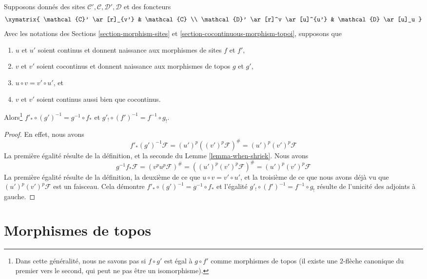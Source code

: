 \begin{lemma}
\label{lemma-special-square-continuous}
Supposons donnés des sites $\mathcal{C}', \mathcal{C}, \mathcal{D}', \mathcal{D}$
et des foncteurs
$$
\xymatrix{
\mathcal{C}' \ar[r]_{v'} &
\mathcal{C} \\
\mathcal{D}' \ar[r]^v \ar[u]^{u'} &
\mathcal{D} \ar[u]_u
}
$$
Avec les notations des Sections \ref{section-morphism-sites}
et \ref{section-cocontinuous-morphism-topoi}, supposons que
\begin{enumerate}
\item $u$ et $u'$ soient continus et donnent naissance aux morphismes de
sites $f$ et $f'$,
\item $v$ et $v'$ soient cocontinus et donnent naissance aux morphismes
de topos $g$ et $g'$,
\item $u \circ v = v' \circ u'$, et
\item $v$ et $v'$ soient continus aussi bien que cocontinus.
\end{enumerate}
Alors\footnote{Dans cette généralité,
nous ne savons pas si $f \circ g'$ est égal à $g \circ f'$
comme morphismes de topos (il existe une $2$-flèche canonique du
premier vers le second, qui peut ne pas être un isomorphisme).}
$f'_* \circ (g')^{-1} = g^{-1} \circ f_*$ et
$g'_! \circ (f')^{-1} = f^{-1} \circ g_!$.
\end{lemma}

\begin{proof}
En effet, nous avons
$$
f'_*(g')^{-1}\mathcal{F} = (u')^p((v')^p\mathcal{F})^\# =
(u')^p(v')^p\mathcal{F}
$$
La première égalité résulte de la définition, et la
seconde du Lemme \ref{lemma-when-shriek}. Nous avons
$$
g^{-1}f_*\mathcal{F} = (v^pu^p\mathcal{F})^\# =
((u')^p(v')^p\mathcal{F})^\# = (u')^p(v')^p\mathcal{F}
$$
La première égalité résulte de la définition, la deuxième de ce que
$u \circ v = v' \circ u'$, et la troisième de ce que nous avons déjà vu que
$(u')^p(v')^p\mathcal{F}$ est un faisceau. Cela démontre
$f'_* \circ (g')^{-1} = g^{-1} \circ f_*$ et l’égalité
$g'_! \circ (f')^{-1} = f^{-1} \circ g_!$ résulte de
l’unicité des adjoints à gauche.
\end{proof}
















\section{Morphismes de topos}
\label{section-morphisms-topoi}

